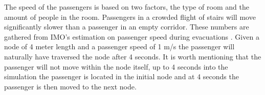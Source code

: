 The speed of the passengers is based on two factors, the type of room and the amount of people in the room. Passengers in a crowded flight of stairs will move significantly slower than a passenger in an empty corridor. These numbers are gathered from IMO's estimation on passenger speed during evacuations \cite{speed}. Given a node of 4 meter length and a passenger speed of 1 m/s the passenger will naturally have traversed the node after 4 seconds. It is worth mentioning that the passenger will not move within the node itself, up to 4 seconds into the simulation the passenger is located in the initial node and at 4 seconds the passenger is then moved to the next node.










